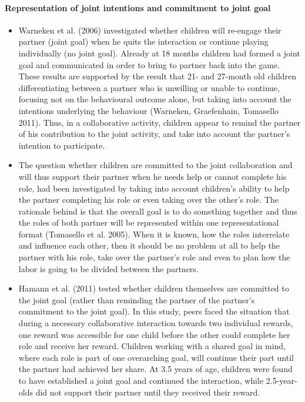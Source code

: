 \documentclass{article}
\begin{document}
\paragraph{Representation of joint intentions and commitment to joint goal}

\begin{itemize}

\item Warneken et al. (2006) investigated whether children will re-engage their
partner (joint goal) when he quits the interaction or continue playing
individually (no joint goal). Already at 18 months children had formed a joint
goal and communicated in order to bring to partner back into the game. These
results are supported by the result that 21- and 27-month old children
differentiating between a partner who is unwilling or unable to continue,
focusing not on the behavioural outcome alone, but taking into account the
intentions underlying the behaviour (Warneken, Graefenhain, Tomasello 2011).
Thus, in a collaborative activity, children appear to remind the partner of his
contribution to the joint activity, and take into account the partner's
intention to participate.

\item The question whether children are committed to the joint collaboration
and will thus support their partner when he needs help or cannot complete his
role, had been investigated by taking into account children's ability to help
the partner completing his role or even taking over the other's role. The
rationale behind is that the overall goal is to do something together and thus
the roles of both partner will be represented within one representational
format (Tomasello et al. 2005). When it is known, how the roles interrelate and
influence each other, then it should be no problem at all to help the partner
with his role, take over the partner's role and even to plan how the labor is
going to be divided between the partners.

\item Hamann et al. (2011) tested whether children themselves are committed to
the joint goal (rather than reminding the partner of the partner's commitment
to the joint goal). In this study, peers faced the situation that during a
necessary collaborative interaction towards two individual rewards, one reward
was accessible for one child before the other could complete her role and
receive her reward. Children working with a shared goal in mind, where each
role is part of one overarching goal, will continue their part until the
partner had achieved her share. At 3.5 years of age, children were found to
have established a joint goal and continued the interaction, while
2.5-year-olds did not support their partner until they received their reward.

\end{itemize}
\end{document}
